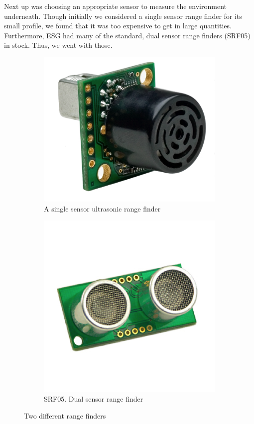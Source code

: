 \documentclass[10pt,titlepage]{article}
\begin{document}
  Next up was choosing an appropriate sensor to measure the environment underneath. Though initially we considered a single sensor range finder for its small profile, we found that it was too expensive to get in large quantities. Furthermore, ESG had many of the standard, dual sensor range finders (SRF05) in stock. Thus, we went with those. \\ 
  \begin{figure}[h!]
      \centering
      \begin{subfigure}[b]{0.48\textwidth}
      \includegraphics[width=\textwidth]{max.png}
      \caption{A single sensor ultrasonic range finder}
      \end{subfigure}
      \begin{subfigure}[b]{0.48\textwidth}
      \includegraphics[width=\textwidth]{srf05.png}
      \caption{SRF05. Dual sensor range finder}
      \end{subfigure}
      \caption{Two different range finders}
  \end{figure} 
\end{document}
